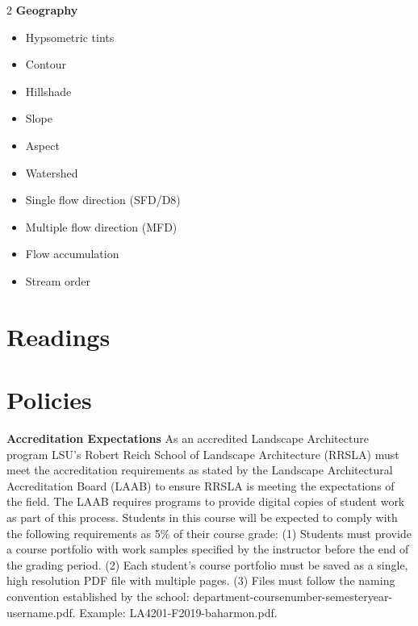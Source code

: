 \documentclass[11pt,article,oneside]{memoir}
\begin{document}
\begin{multicols}{2}
\textbf{Geography}
\begin{itemize}
\item Hypsometric tints
\item Contour
\item Hillshade
\item Slope
\item Aspect
\item Watershed
\item Single flow direction (SFD/D8)
\item Multiple flow direction (MFD)
\item Flow accumulation
\item Stream order
\end{itemize}


\end{multicols}

\clearpage

\section{Readings}
\vspace*{0.5cm}
\nocite{*}
\setlength{}
\printbibliography[heading=none]

\section{Policies}

\noindent \textbf{Accreditation Expectations}
As an accredited Landscape Architecture program
LSU's Robert Reich School of Landscape Architecture (RRSLA) 
must meet the accreditation requirements 
as stated by the Landscape Architectural Accreditation
Board (LAAB) to ensure RRSLA is meeting the expectations of the field. 
The LAAB requires programs to provide digital copies 
of student work as part of this process.
Students in this course will be expected 
to comply with the following requirements
as 5\% of their course grade: 
(1) Students must provide a course portfolio
with work samples specified by the instructor 
before the end of the grading period. 
(2) Each student's course portfolio must be saved as 
a single, high resolution PDF file with multiple pages. 
(3) Files must follow the naming convention
established by the school: department-coursenumber-semesteryear-username.pdf.
Example: LA4201-F2019-baharmon.pdf.\\
\end{document}
